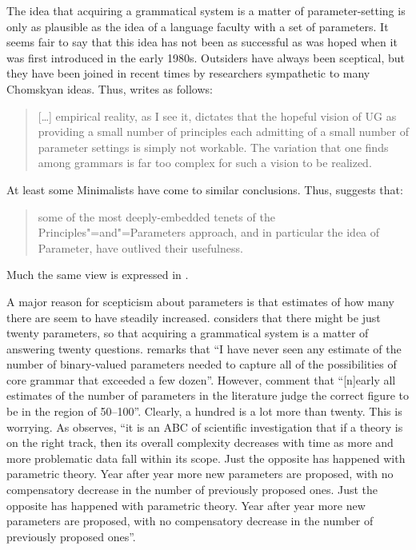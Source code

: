 \documentclass[output=paper]{langsci/langscibook}
\begin{document}
The idea that acquiring a grammatical system is a matter of parameter-setting is only as plausible
as the idea of a language faculty with a set of parameters. It seems fair to say that this idea has
not been as successful as was hoped when it was first introduced in the early 1980s.  Outsiders have
always been sceptical, but they have been joined in recent times by researchers sympathetic to many
Chomskyan ideas. Thus, \citet[]{Newmeyer2005a} writes as follows:

\begin{quotation}
[\ldots] empirical reality, as I see it, dictates that the hopeful vision of UG as providing a small
number of principles each admitting of a small number of parameter settings is simply not
workable. The variation that one finds among grammars is far too complex for such a vision to be
realized.
\end{quotation}
%
At least some Minimalists have come to similar conclusions. Thus, \citet[]{Boeckx2011a-u} suggests that:
\begin{quotation}
some of the most deeply-embedded tenets of the Principles"=and"=Parameters approach, and in particular
the idea of Parameter, have outlived their usefulness. \citep[]{Boeckx2011a-u}
\end{quotation}
%
Much the same view is expressed in .

A major reason for scepticism about parameters is that estimates of how many there are seem to have
steadily increased. \citet[]{Fodor2001a-u} considers that there might be just twenty parameters, so that
acquiring a grammatical system is a matter of answering twenty questions. \citet[]{Newmeyer2005a} remarks that ``I have never seen any estimate of the number of binary-valued
parameters needed to capture all of the possibilities of core grammar that exceeded a few
dozen''. However, \citet{RH2005a} comment that ``[n]early all estimates of the number of
parameters in the literature judge the correct figure to be in the region of 50--100''. Clearly, a
hundred is a lot more than twenty. This is worrying. As \citet[]{Newmeyer2006a-u} observes, ``it
is an ABC of scientific investigation that if a theory is on the right track, then its overall
complexity decreases with time as more and more problematic data fall within its scope. Just the
opposite has happened with parametric theory. Year after year more new parameters are proposed, with
no compensatory decrease in the number of previously proposed ones. Just the opposite has happened
with parametric theory. Year after year more new parameters are proposed, with no compensatory
decrease in the number of previously proposed ones''.
\end{document}
